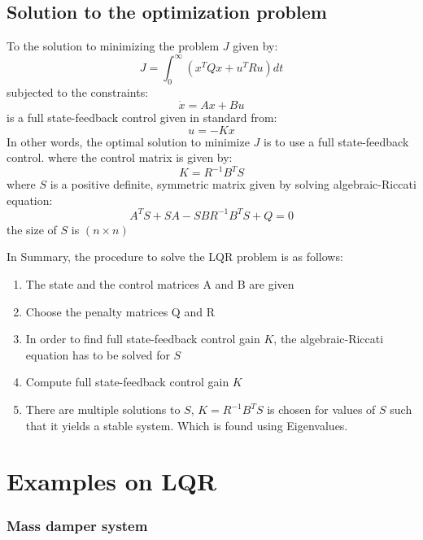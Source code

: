 \subsection{Solution to the optimization problem}

To the solution to minimizing the problem $J$ given by:
\begin{equation}
	J = \int_{0}^{\infty} \left(x^{T} Q x + u^{T} R u\right) dt
\end{equation}
subjected to the constraints:
\begin{equation}
	\dot{x} = Ax + Bu
\end{equation}
is a full state-feedback control given in standard from:
\begin{equation}
	u = -K x
\end{equation}
In other words, the optimal solution to minimize $J$ is to use a full state-feedback control. where the control matrix is given by:
\begin{equation}
	K = R^{-1} B^{T} S
\end{equation}
where $S$ is a positive definite, symmetric matrix given by solving algebraic-Riccati equation:
\begin{equation}
	A^{T}S + SA - SBR^{-1} B^{T} S + Q = 0
\end{equation}
the size of $S$ is $(n \times n)$

In Summary, the procedure to solve the LQR problem is as follows:
\begin{enumerate}
	\item The state and the control matrices A and B are given 
	\item Choose the penalty matrices Q and R
	\item In order to find full state-feedback control gain $K$, the algebraic-Riccati equation has to be solved for $S$
	\item Compute full state-feedback control gain $K$
	\item There are multiple solutions to $S$, $K = R^{-1} B^{T} S$ is chosen for values of $S$ such that it yields a stable system. Which is found using Eigenvalues.
\end{enumerate}

\section{Examples on LQR}

\subsubsection{Mass damper system}

